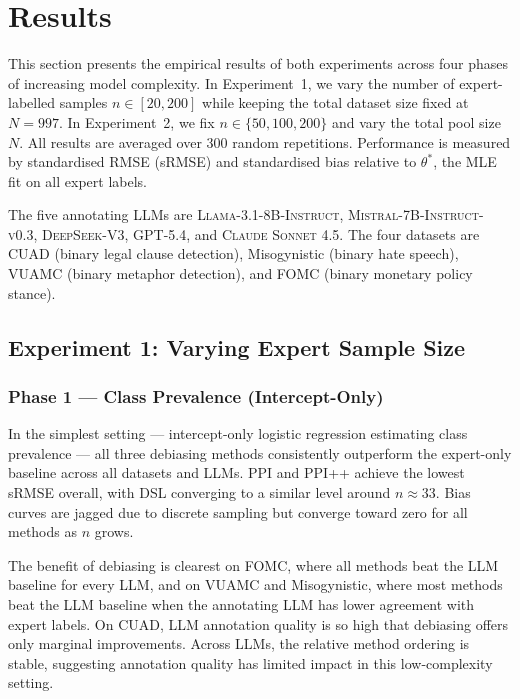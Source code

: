 \section{Results}
\label{sec:results}

This section presents the empirical results of both experiments across four phases of increasing model complexity. In Experiment~1, we vary the number of expert-labelled samples $n \in [20, 200]$ while keeping the total dataset size fixed at $N = 997$. In Experiment~2, we fix $n \in \{50, 100, 200\}$ and vary the total pool size $N$. All results are averaged over 300 random repetitions. Performance is measured by standardised RMSE (sRMSE) and standardised bias relative to $\theta^*$, the MLE fit on all expert labels.

The five annotating LLMs are \textsc{Llama-3.1-8B-Instruct}, \textsc{Mistral-7B-Instruct-v0.3}, \textsc{DeepSeek-V3}, \textsc{GPT-5.4}, and \textsc{Claude Sonnet 4.5}. The four datasets are CUAD (binary legal clause detection), Misogynistic (binary hate speech), VUAMC (binary metaphor detection), and FOMC (binary monetary policy stance).

\subsection{Experiment 1: Varying Expert Sample Size}
\label{sec:exp1}

\subsubsection{Phase 1 — Class Prevalence (Intercept-Only)}
\label{sec:exp1-phase1}

In the simplest setting — intercept-only logistic regression estimating class prevalence — all three debiasing methods consistently outperform the expert-only baseline across all datasets and LLMs. PPI and PPI++ achieve the lowest sRMSE overall, with DSL converging to a similar level around $n \approx 33$. Bias curves are jagged due to discrete sampling but converge toward zero for all methods as $n$ grows.

The benefit of debiasing is clearest on FOMC, where all methods beat the LLM baseline for every LLM, and on VUAMC and Misogynistic, where most methods beat the LLM baseline when the annotating LLM has lower agreement with expert labels. On CUAD, LLM annotation quality is so high that debiasing offers only marginal improvements. Across LLMs, the relative method ordering is stable, suggesting annotation quality has limited impact in this low-complexity setting.

